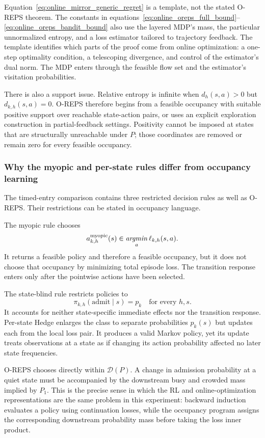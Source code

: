 Equation~\eqref{eq:online_mirror_generic_regret} is a template, not the stated O-REPS theorem. The constants in equations~\eqref{eq:online_oreps_full_bound}--\eqref{eq:online_oreps_bandit_bound} also use the layered MDP's mass, the particular unnormalized entropy, and a loss estimator tailored to trajectory feedback. The template identifies which parts of the proof come from online optimization: a one-step optimality condition, a telescoping divergence, and control of the estimator's dual norm. The MDP enters through the feasible flow set and the estimator's visitation probabilities.

There is also a support issue. Relative entropy is infinite when $d_h(s,a)>0$ but $d_{k,h}(s,a)=0$. O-REPS therefore begins from a feasible occupancy with suitable positive support over reachable state-action pairs, or uses an explicit exploration construction in partial-feedback settings. Positivity cannot be imposed at states that are structurally unreachable under $P$; those coordinates are removed or remain zero for every feasible occupancy.

\subsubsection{Why the myopic and per-state rules differ from occupancy learning}

The timed-entry comparison contains three restricted decision rules as well as O-REPS. Their restrictions can be stated in occupancy language.

The myopic rule chooses
\[
a_{k,h}^{\mathrm{myopic}}(s)
\in\mathop{\it argmin}_a\ell_{k,h}(s,a).
\]
It returns a feasible policy and therefore a feasible occupancy, but it does not choose that occupancy by minimizing total episode loss. The transition response enters only after the pointwise actions have been selected.

The state-blind rule restricts policies to
\[
\pi_{k,h}(\mathrm{admit}\mid s)=p_k
\quad\text{for every }h,s.
\]
It accounts for neither state-specific immediate effects nor the transition response. Per-state Hedge enlarges the class to separate probabilities $p_k(s)$ but updates each from the local loss pair. It produces a valid Markov policy, yet its update treats observations at a state as if changing its action probability affected no later state frequencies.

O-REPS chooses directly within $\mathcal D(P)$. A change in admission probability at a quiet state must be accompanied by the downstream busy and crowded mass implied by $P_1$. This is the precise sense in which the RL and online-optimization representations are the same problem in this experiment: backward induction evaluates a policy using continuation losses, while the occupancy program assigns the corresponding downstream probability mass before taking the loss inner product.

